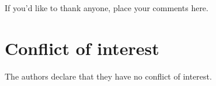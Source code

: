 \begin{acknowledgements}
If you'd like to thank anyone, place your comments here.
\end{acknowledgements}


%
\section*{Conflict of interest}

The authors declare that they have no conflict of interest.






